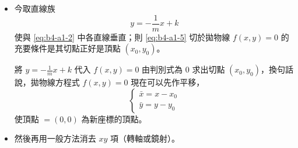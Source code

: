 \begin{itemize}[leftmargin=2em]
  \item[（二）] 今取直線族
  \begin{equation}
  y = -\frac{1}{m}x+k \label{eq:b4-a1-5}
  \end{equation}
  使與 \eqref{eq:b4-a1-2} 中各直線垂直；則 \eqref{eq:b4-a1-5} 切於拋物線 $f(x, y)=0$ 的充要條件是其切點正好是頂點 $(x_0, y_0)$。

  將 $y = -\frac{1}{m}x+k$ 代入 $f(x, y)=0$ 由判別式為 0 求出切點 $(x_0, y_0)$，換句話說，拋物線方程式 $f(x, y)=0$ 現在可以先作平移，
  \[
  \begin{cases}
  \bar{x} = x - x_0 \\
  \bar{y} = y - y_0
  \end{cases}
  \]
  使頂點 $=(0, 0)$ 為新座標的頂點。

  \item[（三）] 然後再用一般方法消去 $xy$ 項（轉軸或鏡射）。
\end{itemize}

